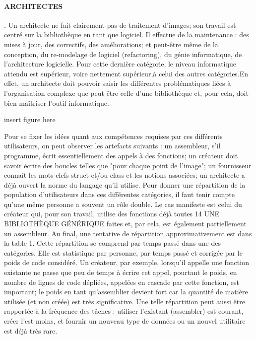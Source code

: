 \paragraph{ARCHITECTES} . Un architecte ne fait clairement pas de traitement d'images; son travail est
centré sur la bibliothèque en tant que logiciel. Il effectue de la maintenance : des mises à jour,
des correctifs, des améliorations; et peut-être même de la conception, du re-modelage de logiciel
(refactoring), du génie informatique, de l'architecture logicielle. Pour cette dernière catégorie, le
niveau informatique attendu est supérieur, voire nettement supérieur,à celui des autres catégories.En
effet, un architecte doit pouvoir saisir les différentes problématiques liées à l'organisation complexe
que peut être celle d'une bibliothèque et, pour cela, doit bien maîtriser l'outil informatique.

insert figure here

Pour se fixer les idées quant aux compétences requises par ces différents utilisateurs, on peut
observer les artefacts suivants : un assembleur, s'il programme, écrit essentiellement des appels à
des fonctions; un créateur doit savoir écrire des boucles telles que "pour chaque point de l'image";
un fournisseur connaît les mots-clefs struct et/ou class et les notions associées; un architecte a déjà
ouvert la norme du langage qu'il utilise. Pour donner une répartition de la population d'utilisateurs
dans ces différentes catégories, il faut tenir compte qu'une même personne a souvent un rôle
double. Le cas manifeste est celui du créateur qui, pour son travail, utilise des fonctions déjà toutes
14 UNE BIBLIOTHÈQUE GÉNÉRIQUE
faites et, par cela, est également partiellement un assembleur. Au final, une tentative de répartition
approximativement est dans la table 1.
Cette répartition se comprend par temps passé dans une des catégories. Elle est statistique par
personne, par temps passé et corrigée par le poids de code considéré. Un créateur, par exemple,
lorsqu'il appelle une fonction existante ne passe que peu de temps à écrire cet appel, pourtant le
poids, en nombre de lignes de code dépliées, appelées en cascade par cette fonction, est important;
le poids en tant qu'assemblier devient fort car la quantité de matière utilisée (et non créée) est très
significative.
Une telle répartition peut aussi être rapportée à la fréquence des tâches : utiliser l'existant
(assembler) est courant, créer l'est moins, et fournir un nouveau type de données ou un nouvel
utilitaire est déjà très rare.

